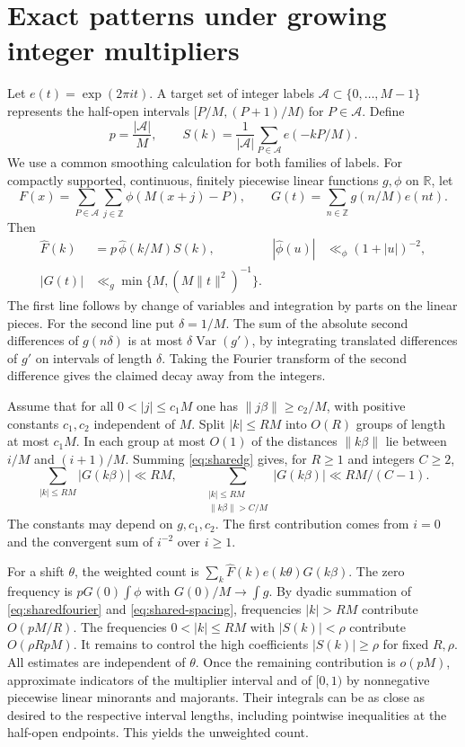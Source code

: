 \section{Exact patterns under growing integer multipliers}\label{sec:positive-multipliers}

Let $e(t)=\exp(2\pi i t)$. A target set of integer labels $\mathcal A\subset\{0,\ldots,M-1\}$ represents the half-open intervals $[P/M,(P+1)/M)$ for $P\in\mathcal A$. Define
\[
 p=\frac{|\mathcal A|}{M},\qquad S(k)=\frac1{|\mathcal A|}
                      \sum_{P\in\mathcal A}e(-kP/M).
\]
We use a common smoothing calculation for both families of labels. For compactly supported, continuous, finitely piecewise linear functions $g,\phi$ on $\mathbb R$, let
\[
 F(x)=\sum_{P\in\mathcal A}\sum_{j\in\mathbb Z}\phi(M(x+j)-P),
 \qquad G(t)=\sum_{n\in\mathbb Z}g(n/M)e(nt).
\]
Then
\begin{align}
 \widehat F(k)&=p\,\widehat\phi(k/M)S(k),
 &|\widehat\phi(u)|&\ll_\phi(1+|u|)^{-2},\label{eq:sharedfourier}\\
 |G(t)|&\ll_g\min\{M,(M\|t\|^2)^{-1}\}.\label{eq:sharedg}
\end{align}
The first line follows by change of variables and integration by parts on the linear pieces. For the second line put $\delta=1/M$. The sum of the absolute second differences of $g(n\delta)$ is at most $\delta\operatorname{Var}(g')$, by integrating translated differences of $g'$ on intervals of length $\delta$. Taking the Fourier transform of the second difference gives the claimed decay away from the integers.

Assume that for all $0<|j|\le c_1 M$ one has $\|j\beta\|\ge c_2/M$, with positive constants $c_1,c_2$ independent of $M$. Split $|k|\le RM$ into $O(R)$ groups of length at most $c_1M$. In each group at most $O(1)$ of the distances $\|k\beta\|$ lie between $i/M$ and $(i+1)/M$. Summing \eqref{eq:sharedg} gives, for $R\ge1$ and integers $C\ge2$,
\begin{equation}\label{eq:shared-spacing}
 \sum_{|k|\le RM}|G(k\beta)|\ll RM,\qquad
 \sum_{\substack{|k|\le RM\\ \|k\beta\|>C/M}}|G(k\beta)|
                    \ll RM/(C-1).
\end{equation}
The constants may depend on $g,c_1,c_2$. The first contribution comes from $i=0$ and the convergent sum of $i^{-2}$ over $i\ge1$.

For a shift $\theta$, the weighted count is $\sum_k\widehat F(k)e(k\theta)G(k\beta)$. The zero frequency is
$pG(0)\int\phi$ with $G(0)/M\to\int g$. By dyadic summation of \eqref{eq:sharedfourier} and \eqref{eq:shared-spacing}, frequencies $|k|>RM$ contribute $O(pM/R)$. The frequencies $0<|k|\le RM$ with $|S(k)|<\rho$ contribute $O(\rho RpM)$. It remains to control the high coefficients $|S(k)|\ge\rho$ for fixed $R,\rho$. All estimates are independent of $\theta$. Once the remaining contribution is $o(pM)$, approximate indicators of the multiplier interval and of $[0,1)$ by nonnegative piecewise linear minorants and majorants. Their integrals can be as close as desired to the respective interval lengths, including pointwise inequalities at the half-open endpoints. This yields the unweighted count.

